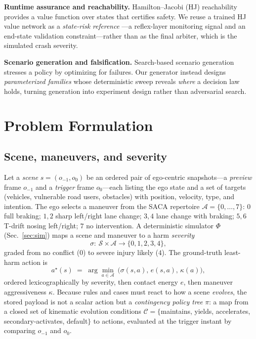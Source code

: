 \documentclass[conference]{IEEEtran}
\begin{document}
\textbf{Runtime assurance and reachability.} Hamilton--Jacobi (HJ)
reachability~\cite{hj} provides a value function over states that certifies
safety. We reuse a trained HJ value network as a \emph{state-risk reference}
---a reflex-layer monitoring signal and an end-state validation
constraint---rather than as the final arbiter, which is the simulated crash
severity.

\textbf{Scenario generation and falsification.} Search-based scenario
generation stresses a policy by optimizing for failures. Our generator
instead designs \emph{parameterized families} whose deterministic sweep
reveals \emph{where} a decision law holds, turning generation into experiment
design rather than adversarial search.

\section{Problem Formulation}

\subsection{Scene, maneuvers, and severity}
Let a \emph{scene} $s=(o_{-1},o_0)$ be an ordered pair of ego-centric
snapshots---a \emph{preview} frame $o_{-1}$ and a \emph{trigger} frame
$o_0$---each listing the ego state and a set of targets (vehicles, vulnerable
road users, obstacles) with position, velocity, type, and intention. The ego
selects a maneuver from the SACA repertoire
$\mathcal{A}=\{0,\dots,7\}$: $0$ full braking; $1,2$ sharp left/right lane
change; $3,4$ lane change with braking; $5,6$ T-drift nosing left/right; $7$
no intervention. A deterministic simulator $\Phi$ (Sec.~\ref{sec:sim}) maps a
scene and maneuver to a harm \emph{severity}
\begin{equation}
\sigma:\ \mathcal{S}\times\mathcal{A}\to\{0,1,2,3,4\},
\end{equation}
graded from no conflict ($0$) to severe injury likely ($4$). The ground-truth
least-harm action is
\begin{equation}
a^\star(s)\;=\;\arg\min_{a\in\mathcal{A}}\ \big(\sigma(s,a),\,e(s,a),\,\kappa(a)\big),
\label{eq:astar}
\end{equation}
ordered lexicographically by severity, then contact energy $e$, then maneuver
aggressiveness $\kappa$. Because rules and cases must react to how a scene
\emph{evolves}, the stored payload is not a scalar action but a
\emph{contingency policy tree} $\pi$: a map from a closed set of kinematic
evolution conditions $\mathcal{C}=\{$maintains, yields, accelerates,
secondary-activates, default$\}$ to actions, evaluated at the trigger instant
by comparing $o_{-1}$ and $o_0$.
\end{document}
